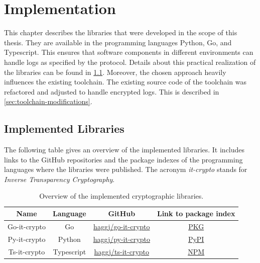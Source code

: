 \documentclass[../main.tex]{subfiles}
\begin{document}
\chapter{Implementation}
\label{chap:implementation}

This chapter describes the libraries that were developed in the scope of this thesis.
They are available in the programming languages Python, Go, and Typescript.
This ensures that software components in different environments can handle logs as specified by the protocol.
Details about this practical realization of the libraries can be found in \cref{sec:implemented-libraries}.
Moreover, the chosen approach heavily influences the existing toolchain.
The existing source code of the toolchain was refactored and adjusted to handle encrypted logs.
This is described in \cref{sec:toolchain-modifications}.

\section{Implemented Libraries}
\label{sec:implemented-libraries}

The following table gives an overview of the implemented libraries.
It includes links to the GitHub repositories and the package indexes of the programming languages where the libraries were published.
The acronym \emph{it-crypto} stands for \emph{Inverse Transparency Cryptography}.

\begin{table}[ht]
    \centering
    \begin{tabular}{|c|c|c|c|}
    \hline
    Name         & Language & GitHub                           & Link to package index                                   \\ \hline
    Go-it-crypto & Go                   & \href{https://github.com/haggj/go-it-crypto}{haggj/go-it-crypto} & \href{https://pkg.go.dev/github.com/haggj/go-it-crypto}{PKG} \\ \hline
    Py-it-crypto & Python               & \href{https://github.com/haggj/py-it-crypto}{haggj/py-it-crypto} & \href{https://pypi.org/project/py-it-crypto/}{PyPI}          \\ \hline
    Ts-it-crypto & Typescript           & \href{https://github.com/haggj/ts-it-crypto}{haggj/ts-it-crypto} & \href{https://www.npmjs.com/package/ts-it-crypto}{NPM}       \\ \hline
    \end{tabular}
    \caption[Implemented libraries]{Overview of the implemented cryptographic libraries.}
\end{table}
\end{document}
